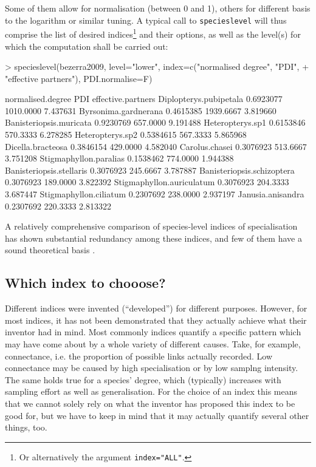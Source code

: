 \documentclass[a4paper, 11pt]{article}
\begin{document}
\noindent Some of them allow for normalisation (between 0 and 1), others for different basis to the logarithm or similar tuning. A typical call to \texttt{specieslevel} will thus comprise the list of desired indices\footnote{Or alternatively the argument \texttt{index="ALL"}.} and their options, as well as the level(s) for which the computation shall be carried out:
\begin{Schunk}
\begin{Sinput}
> specieslevel(bezerra2009, level="lower", index=c("normalised degree", "PDI", 
+       "effective partners"), PDI.normalise=F)
\end{Sinput}
\begin{Soutput}
                           normalised.degree       PDI effective.partners
Diplopterys.pubipetala             0.6923077 1010.0000           7.437631
Byrsonima.gardnerana               0.4615385 1939.6667           3.819660
Banisteriopsis.muricata            0.9230769  657.0000           9.191488
Heteropterys.sp1                   0.6153846  570.3333           6.278285
Heteropterys.sp2                   0.5384615  567.3333           5.865968
Dicella.bracteosa                  0.3846154  429.0000           4.582040
Carolus.chasei                     0.3076923  513.6667           3.751208
Stigmaphyllon.paralias             0.1538462  774.0000           1.944388
Banisteriopsis.stellaris           0.3076923  245.6667           3.787887
Banisteriopsis.schizoptera         0.3076923  189.0000           3.822392
Stigmaphyllon.auriculatum          0.3076923  204.3333           3.687447
Stigmaphyllon.ciliatum             0.2307692  238.0000           2.937197
Janusia.anisandra                  0.2307692  220.3333           2.813322
\end{Soutput}
\end{Schunk}
A relatively comprehensive comparison of species-level indices of specialisation \citep{Dormann2011} has shown substantial redundancy among these indices, and few of them have a sound theoretical basis \cite{Poisot2012a}.



\subsection{Which index to chooose?}%
Different indices were invented (``developed'') for different purposes. However, for most indices, it has not been demonstrated that they actually achieve what their inventor had in mind. Most commonly indices quantify a specific pattern which may have come about by a whole variety of different causes. Take, for example, connectance, i.e. the proportion of possible links actually recorded. Low connectance may be caused by high specialisation or by low samplng intensity. The same holds true for a species' degree, which (typically) increases with sampling effort as well as generalisation. For the choice of an index this means that we cannot solely rely on what the inventor has proposed this index to be good for, but we have to keep in mind that it may actually quantify several other things, too.
\end{document}
